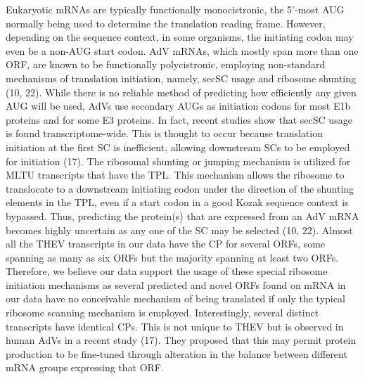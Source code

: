 \documentclass[
]{article}
\begin{document}
Eukaryotic mRNAs are typically functionally monocistronic, the 5'-most
AUG normally being used to determine the translation reading frame.
However, depending on the sequence context, in some organisms, the
initiating codon may even be a non-AUG start codon. AdV mRNAs, which
mostly span more than one ORF, are known to be functionally
polycistronic, employing non-standard mechanisms of translation
initiation, namely, secSC usage and ribosome shunting (10, 22). While
there is no reliable method of predicting how efficiently any given AUG
will be used, AdVs use secondary AUGs as initiation codons for most E1b
proteins and for some E3 proteins. In fact, recent studies show that
secSC usage is found transcriptome-wide. This is thought to occur
because translation initiation at the first SC is inefficient, allowing
downstream SCs to be employed for initiation (17). The ribosomal
shunting or jumping mechanism is utilized for MLTU transcripts that have
the TPL. This mechanism allows the ribosome to translocate to a
downstream initiating codon under the direction of the shunting elements
in the TPL, even if a start codon in a good Kozak sequence context is
bypassed. Thus, predicting the protein(s) that are expressed from an AdV
mRNA becomes highly uncertain as any one of the SC may be selected (10,
22). Almost all the THEV transcripts in our data have the CP for several
ORFs, some spanning as many as six ORFs but the majority spanning at
least two ORFs. Therefore, we believe our data support the usage of
these special ribosome initiation mechanisms as several predicted and
novel ORFs found on mRNA in our data have no conceivable mechanism of
being translated if only the typical ribosome scanning mechanism is
employed. Interestingly, several distinct transcripts have identical
CPs. This is not unique to THEV but is observed in human AdVs in a
recent study (17). They proposed that this may permit protein production
to be fine-tuned through alteration in the balance between different
mRNA groups expressing that ORF.
\end{document}
